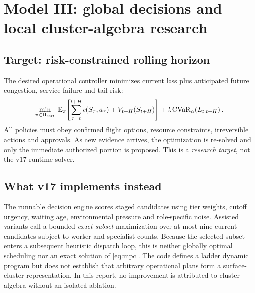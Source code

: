 \documentclass[10pt,a4paper]{article}
\theoremstyle{definition}\newtheorem{definition}[theorem]{Definition}
\theoremstyle{remark}\newtheorem{remark}[theorem]{Remark}
\newcommand{\E}{\mathbb E}
\newcommand{\1}{\mathbbm 1}
\begin{document}
\section{Model III: global decisions and local cluster-algebra research}
\subsection{Target: risk-constrained rolling horizon}
The desired operational controller minimizes current loss plus anticipated future congestion, service failure and tail risk:
\begin{equation}\label{eq:mpc}\min_{\pi\in\Pi_{\rm cert}}\;\E_\pi\!\left[\sum_{\tau=t}^{t+H}c(S_\tau,a_\tau)+V_{t+H}(S_{t+H})\right]+\lambda\operatorname{CVaR}_\alpha\!\left(L_{t:t+H}\right).
\end{equation}
All policies must obey confirmed flight options, resource constraints, irreversible actions and approvals. As new evidence arrives, the optimization is re-solved and only the immediate authorized portion is proposed. This is a \emph{research target}, not the v17 runtime solver.

\subsection{What v17 implements instead}
The runnable decision engine scores staged candidates using tier weights, cutoff urgency, waiting age, environmental pressure and role-specific noise. Assisted variants call a bounded \emph{exact subset} maximization over at most nine current candidates subject to worker and specialist counts. Because the selected subset enters a subsequent heuristic dispatch loop, this is neither globally optimal scheduling nor an exact solution of \eqref{eq:mpc}. The code defines a ladder dynamic program but does not establish that arbitrary operational plans form a surface-cluster representation. In this report, no improvement is attributed to cluster algebra without an isolated ablation.
\end{document}
